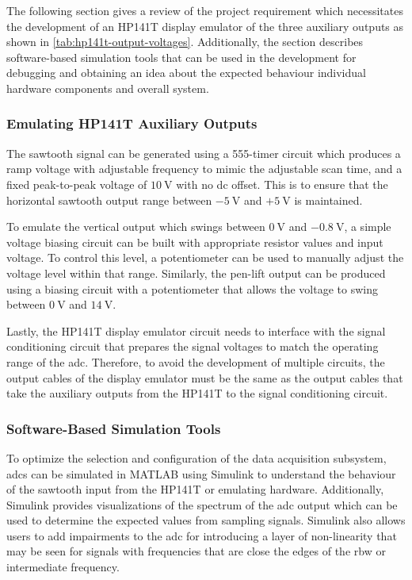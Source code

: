 \documentclass[class=report,11pt,crop=false]{standalone}
\begin{document}
	The following section gives a review of the project requirement which necessitates the development of an HP141T display emulator of the three auxiliary outputs as shown in \ref{tab:hp141t-output-voltages}. Additionally, the section describes software-based simulation tools that can be used in the development for debugging and obtaining an idea about the expected behaviour individual hardware components and overall system.
	
	\subsubsection{Emulating HP141T Auxiliary Outputs}
	
	The sawtooth signal can be generated using a 555-timer circuit which produces a ramp voltage with adjustable frequency to mimic the adjustable scan time, and a fixed peak-to-peak voltage of $\SI{10}{\volt}$ with no \acrshort{dc} offset. This is to ensure that the horizontal sawtooth output range between $-\SI{5}{\volt}$ and $+\SI{5}{\volt}$ is maintained. 
	
	To emulate the vertical output which swings between $\SI{0}{\volt}$ and $-\SI{0.8}{\volt}$, a simple voltage biasing circuit can be built with appropriate resistor values and input voltage. To control this level, a potentiometer can be used to manually adjust the voltage level within that range. Similarly, the pen-lift output can be produced using a biasing circuit with a potentiometer that allows the voltage to swing between $\SI{0}{\volt}$ and $\SI{14}{\volt}$. 
	
	Lastly, the HP141T display emulator circuit needs to interface with the signal conditioning circuit that prepares the signal voltages to match the operating range of the \acrshort{adc}. Therefore, to avoid the development of multiple circuits, the output cables of the display emulator must be the same as the output cables that take the auxiliary outputs from the HP141T to the signal conditioning circuit.
	
	\subsubsection{Software-Based Simulation Tools}
	
	To optimize the selection and configuration of the data acquisition subsystem, \acrshort{adc}s can be simulated in MATLAB using Simulink to understand the behaviour of the sawtooth input from the HP141T or emulating hardware. Additionally, Simulink provides visualizations of the spectrum of the \acrshort{adc} output which can be used to determine the expected values from sampling signals. Simulink also allows users to add impairments to the \acrshort{adc} for introducing a layer of non-linearity that may be seen for signals with frequencies that are close the edges of the \acrshort{rbw} or intermediate frequency. 
	
\end{document}
